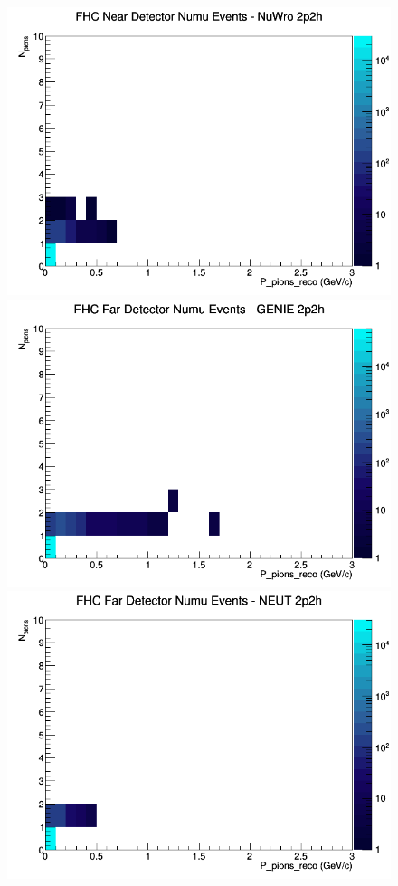 \documentclass[12pt]{article}
\begin{document}
\begin{figure}[h]
\includegraphics[width=\linewidth]{eff_N_P/LAr/pions/2p2h_FHC_ND_numu_N_P_NuWro.png}
\endminipage
\newline
{}
\includegraphics[width=\linewidth]{eff_N_P/LAr/pions/2p2h_FHC_FD_numu_N_P_GENIE.png}
\endminipage
{}
\includegraphics[width=\linewidth]{eff_N_P/LAr/pions/2p2h_FHC_FD_numu_N_P_NEUT.png}

\end{figure}
\end{document}
